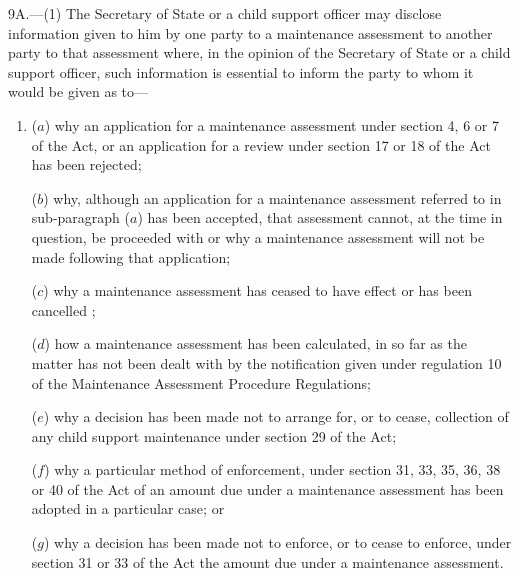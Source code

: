 \documentclass[a4paper,12pt]{article}
\begin{document}
9A.—(1) The Secretary of State or a child support officer may disclose information given to him by one party to a maintenance assessment to another party to that assessment where, in the opinion of the Secretary of State or a child support officer, such information is essential to inform the party to whom it would be given as to—
\begin{enumerate}\item[]
($a$) why an application for a maintenance assessment under section 4, 6 or 7 of the Act, or an application for a review under section 17 or 18 of the Act has been rejected;

($b$) why, although an application for a maintenance assessment referred to in sub-paragraph ($a$) has been accepted, that assessment cannot, at the time in question, be proceeded with or why a maintenance assessment will not be made following that application;

($c$) why a maintenance assessment has ceased to have effect or has been cancelled%
;


($d$) how a maintenance assessment has been calculated, in so far as the matter has not been dealt with by the notification given under regulation 10 of the Maintenance Assessment Procedure Regulations;

($e$) why a decision has been made not to arrange for, or to cease, collection of any child support maintenance under section 29 of the Act;

($f$) why a particular method of enforcement, under section 31, 33, 35, 36, 38 or 40 of the Act of an amount due under a maintenance assessment has been adopted in a particular case; or

($g$) why a decision has been made not to enforce, or to cease to enforce, under section 31 or 33 of the Act the amount due under a maintenance assessment.
\end{enumerate}
\end{document}

